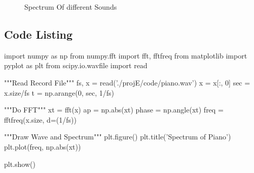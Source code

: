 \documentclass{article}
\begin{document}
\begin{figure}[!h]
	\centering
	\hspace{0 pt}
	\hspace{0 pt}
	\caption{Spectrum Of different Sounds}
	\label{fig:spectrumComparison} 
\end{figure}

\newpage





\begin{appendices}
\section{Code Listing}
\begin{python}
import numpy as np
from numpy.fft import fft, fftfreq
from matplotlib import pyplot as plt
from scipy.io.wavfile import read

"""Read Record File"""
fs, x = read('./projE/code/piano.wav')
x = x[:, 0]
sec = x.size/fs
t = np.arange(0, sec, 1/fs)

"""Do FFT"""
xt = fft(x)
ap = np.abs(xt)
phase = np.angle(xt)
freq = fftfreq(x.size, d=(1/fs))

"""Draw Wave and Spectrum"""
plt.figure()
plt.title('Spectrum of Piano')
plt.plot(freq, np.abs(xt))

plt.show()

\end{python}
\end{appendices}
\end{document}
